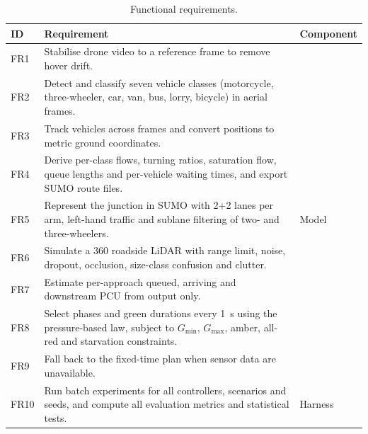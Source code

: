 \begin{table}[H]
\centering
\caption{Functional requirements.}
\label{tab:fr}
\small
\begin{tabularx}{\textwidth}{@{}lXl@{}}
\toprule
\textbf{ID} & \textbf{Requirement} & \textbf{Component}\\
\midrule
FR1 & Stabilise drone video to a reference frame to remove hover drift. & \dtx{}\\
FR2 & Detect and classify seven vehicle classes (motorcycle, three-wheeler, car, van, bus, lorry, bicycle) in aerial frames. & \dtx{}\\
FR3 & Track vehicles across frames and convert positions to metric ground coordinates. & \dtx{}\\
FR4 & Derive per-class flows, turning ratios, saturation flow, queue lengths and per-vehicle waiting times, and export SUMO route files. & \dtx{}\\
FR5 & Represent the junction in SUMO with 2+2 lanes per arm, left-hand traffic and sublane filtering of two- and three-wheelers. & Model\\
FR6 & Simulate a 360\textdegree{} roadside LiDAR with range limit, noise, dropout, occlusion, size-class confusion and clutter. & \vls{}\\
FR7 & Estimate per-approach queued, arriving and downstream PCU from \vls{} output only. & \prism{}\\
FR8 & Select phases and green durations every 1~s using the pressure-based law, subject to $G_{\min}$, $G_{\max}$, amber, all-red and starvation constraints. & \prism{}\\
FR9 & Fall back to the fixed-time plan when sensor data are unavailable. & \prism{}\\
FR10 & Run batch experiments for all controllers, scenarios and seeds, and compute all evaluation metrics and statistical tests. & Harness\\
\bottomrule
\end{tabularx}
\end{table}

